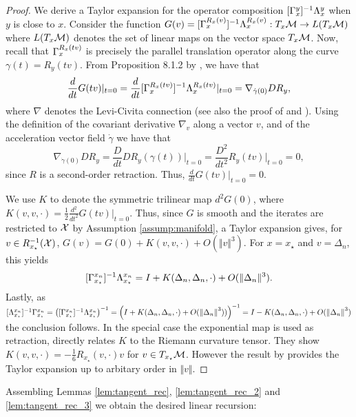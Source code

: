 \begin{proof}
  We derive a Taylor expansion for the operator composition $[\Gamma_{x}^{y}]^{-1}\Lambda_{x}^{y}$ when $y$ is close to $x$. Consider the function $G(v)= [\Gamma_{x}^{R_x(v)}]^{-1}\Lambda_{x}^{R_x(v)}: T_x\mathcal{M}\to L(T_x\mathcal{M})$ where $L(T_x\mathcal{M})$ denotes the set of linear maps on the vector space $T_x\mathcal{M}$. Now, recall that $\Gamma_{x}^{R_x(tv)}$ is precisely the parallel translation operator along the curve $\gamma(t)=R_y(tv)$. From Proposition 8.1.2 by \citet{absil2009optimization}, we have that
  \[
  \frac{d}{dt} G(tv)\vert_{t=0} =   \frac{d}{dt}  [\Gamma_{x}^{R_x(tv)}]^{-1}\Lambda_{x}^{R_x(tv)}\vert_{t=0} = \nabla_{\dot \gamma(0)} D R_y,
  \]
  where $\nabla$ denotes the Levi-Civita connection (see also the proof of \citet[Lemma 7.4.7]{absil2009optimization} and \citet[Chapter 2, Exercise 2]{do2016differential}). Using the definition of the covariant derivative $\nabla_{v}$ along a vector $v$, and of the acceleration vector field $\dot{\gamma}$ \citep[Section 5.4]{absil2009optimization}
  we have that
  \[
   \nabla_{\dot \gamma(0)} D R_y= \frac{D}{dt} D R_y(\gamma(t))\vert_{t=0} = \frac{D^2}{dt^2} R_y(tv)\vert_{t=0}=0,
  \]
  since $R$ is a second-order retraction. Thus, $  \frac{d}{dt} G(tv)\vert_{t=0}=0$.

 We use $K$ to denote the symmetric trilinear map $d^2G(0)$, where $K(v,v,\cdot)=\frac{1}{2}\frac{d^2}{dt^2} G(tv)\vert_{t=0}$. Thus, since $G$ is smooth and the iterates are restricted to $\mathcal{X}$ by Assumption \ref{assump:manifold},
 a Taylor expansion gives, for $v\in R_{x_\star}^{-1}(\mathcal{X})$,
 $
 G(v)=G(0)+K(v,v,\cdot)+O(\Vert v \Vert^3)
 $.
 For $x=x_\star$ and $v=\Delta_n$, this yields
 \[
 [\Gamma_{x_\star}^{x_n}]^{-1}\Lambda_{x_\star}^{x_n}= I+K(\Delta_n,\Delta_n,\cdot)+O(\Vert \Delta_n \Vert^3).
 \]
 Lastly, as
  $  [\Lambda_{x_\star}^{x_n}]^{-1}\Gamma_{x_\star}^{x_n} = \left([\Gamma_{x_\star}^{x_n}]^{-1} \Lambda_{x_\star}^{x_n} \right)^{-1} = \left( I + K(\Delta_n,\Delta_n, \cdot) + O(\norm{\Delta_n}^3)) \right)^{-1} = I -  K(\Delta_n, \Delta_n,\cdot)  + O(\norm{\Delta_n}^3)$
  the conclusion follows.
In the special case the exponential map is used as retraction, \citet[][Theorem A.2.9]{waldmann2012geometric}  directly relates $K$ to the Riemann curvature tensor. They show $K(v,v,\cdot)=-\frac{1}{6}R_{x_\star}(v,\cdot)v$ for $v\in T_{x_\star}\mathcal{M}$. However the result by \citet{waldmann2012geometric} provides the Taylor expansion up to arbitary order in $\Vert v \Vert$.
\end{proof}
Assembling Lemmas  \ref{lem:tangent_rec}, \ref{lem:tangent_rec_2} and \ref{lem:tangent_rec_3} we obtain the desired linear recursion:
